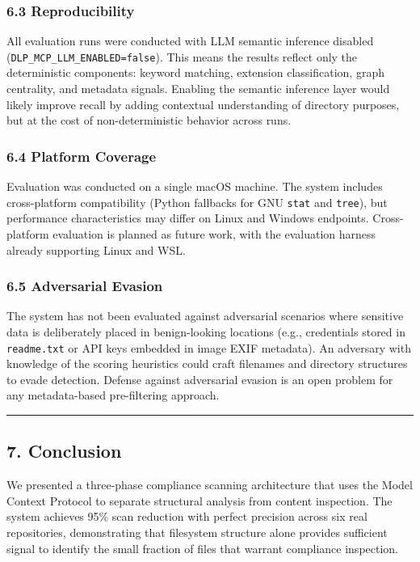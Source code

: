 \documentclass[
]{article}
\begin{document}
\subsubsection{6.3 Reproducibility}\label{reproducibility}

All evaluation runs were conducted with LLM semantic inference disabled
(\texttt{DLP\_MCP\_LLM\_ENABLED=false}). This means the results reflect
only the deterministic components: keyword matching, extension
classification, graph centrality, and metadata signals. Enabling the
semantic inference layer would likely improve recall by adding
contextual understanding of directory purposes, but at the cost of
non-deterministic behavior across runs.

\subsubsection{6.4 Platform Coverage}\label{platform-coverage}

Evaluation was conducted on a single macOS machine. The system includes
cross-platform compatibility (Python fallbacks for GNU \texttt{stat} and
\texttt{tree}), but performance characteristics may differ on Linux and
Windows endpoints. Cross-platform evaluation is planned as future work,
with the evaluation harness already supporting Linux and WSL.

\subsubsection{6.5 Adversarial Evasion}\label{adversarial-evasion}

The system has not been evaluated against adversarial scenarios where
sensitive data is deliberately placed in benign-looking locations (e.g.,
credentials stored in \texttt{readme.txt} or API keys embedded in image
EXIF metadata). An adversary with knowledge of the scoring heuristics
could craft filenames and directory structures to evade detection.
Defense against adversarial evasion is an open problem for any
metadata-based pre-filtering approach.

\begin{center}\rule{0.5\linewidth}{0.5pt}\end{center}

\subsection{7. Conclusion}\label{conclusion}

We presented a three-phase compliance scanning architecture that uses
the Model Context Protocol to separate structural analysis from content
inspection. The system achieves 95\% scan reduction with perfect
precision across six real repositories, demonstrating that filesystem
structure alone provides sufficient signal to identify the small
fraction of files that warrant compliance inspection.
\end{document}
